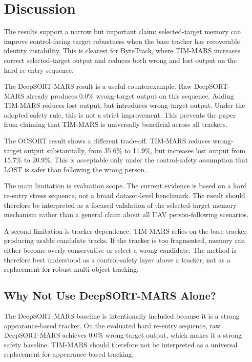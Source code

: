\section{Discussion}

The results support a narrow but important claim: selected-target memory can improve control-facing target robustness when the base tracker has recoverable identity instability. This is clearest for ByteTrack, where TIM-MARS increases correct selected-target output and reduces both wrong and lost output on the hard re-entry sequence.

The DeepSORT-MARS result is a useful counterexample. Raw DeepSORT-MARS already produces 0.0\% wrong-target output on this sequence. Adding TIM-MARS reduces lost output, but introduces wrong-target output. Under the adopted safety rule, this is not a strict improvement. This prevents the paper from claiming that TIM-MARS is universally beneficial across all trackers.

The OCSORT result shows a different trade-off. TIM-MARS reduces wrong-target output substantially, from 35.6\% to 11.9\%, but increases lost output from 15.7\% to 20.9\%. This is acceptable only under the control-safety assumption that LOST is safer than following the wrong person.

The main limitation is evaluation scope. The current evidence is based on a hard re-entry stress sequence, not a broad dataset-level benchmark. The result should therefore be interpreted as a focused validation of the selected-target memory mechanism rather than a general claim about all UAV person-following scenarios.

A second limitation is tracker dependence. TIM-MARS relies on the base tracker producing usable candidate tracks. If the tracker is too fragmented, memory can either become overly conservative or select a wrong candidate. The method is therefore best understood as a control-safety layer above a tracker, not as a replacement for robust multi-object tracking.

\subsection{Why Not Use DeepSORT-MARS Alone?}

The DeepSORT-MARS baseline is intentionally included because it is a strong appearance-based tracker. On the evaluated hard re-entry sequence, raw DeepSORT-MARS achieves 0.0\% wrong-target output, which makes it a strong safety baseline. TIM-MARS should therefore not be interpreted as a universal replacement for appearance-based tracking.


